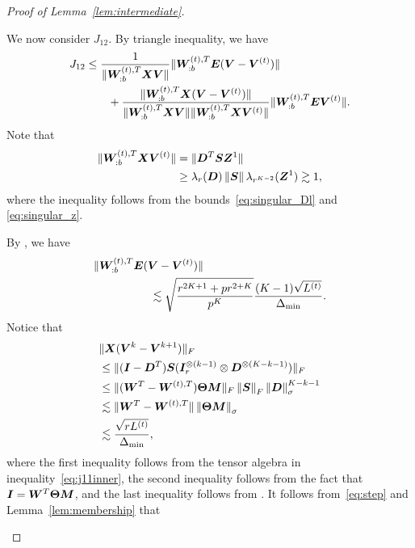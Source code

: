 \documentclass[journal]{IEEEtran}
\theoremstyle{definition}
\theoremstyle{definition}
\begin{document}
\begin{proof}[Proof of Lemma~\ref{lem:intermediate}]
\begin{enumerate}[wide]
    
    We now consider $J_{12}$. By triangle inequality, we have 
    \begin{align}
        J_{12} &\leq \frac{ 1}{\lVert\bm{W}_{:b}^{(t),T} \bm X \bm{V} \rVert} \lVert\bm{W}_{:b}^{(t),T} \bm{E} (\bm{V}-\bm{V}^{(t)})\rVert  \\
        & \quad \quad +
        \frac{ \lVert\bm{W}_{:b}^{(t),T} \bm X (\bm{V}-\bm{V}^{(t)})\rVert }{\lVert\bm{W}_{:b}^{(t),T} \bm X \bm{V} \rVert\lVert\bm{W}_{:b}^{(t),T} \bm X \bm{V}^{(t)} \rVert} \lVert\bm{W}_{:b}^{(t),T} \bm{E} \bm{V}^{(t)} \rVert.
    \end{align}
     Note that 
     \begin{align}
          \onormSize{}{\mW_{:b}^{(t),T} \mX \mV^{(t)}} &= \onormSize{}{\mD^T \mS \mZ^1} 
          \\ &\geq \lambda_r(\mD) \onorm{\mS} \lambda_{r^{K-2}}(\mZ^1) \gtrsim 1, \label{eq:j11_wxvt}
     \end{align}
    where the inequality follows from the bounds~\eqref{eq:singular_Dl} and \eqref{eq:singular_z}.
    
    By \cite[Proof of Lemma 5]{han2020exact}, we have 
    \begin{align}
       & \onormSize{}{\mW_{:b}^{(t),T} \mE (\mV-\mV^{(t)})} \\
        & \quad \quad \quad \quad \quad \lesssim \sqrt{ \frac{r^{2K+1} + p r^{2 + K}}{p^K} } \frac{(K-1)\sqrt{L^{(t)}}}{\Delta_{\min}}. \label{eq:j12_wev}
    \end{align}
    Notice that 
    \begin{align}
        & \onormSize{}{\mX (\mV^k-\mV^{k+1})}_F \\ &\leq \onormSize{}{(\mI - \mD^T) \mS (\mI_r^{\otimes (k-1)} \otimes  \mD^{\otimes (K-k-1)})}_F\notag \\
        &\leq \onormSize{}{(\mW^T - \mW^{(t),T}) \mTheta \mM}_F \onorm{\mS}_F \onorm{ \mD}_{\sigma}^{K-k-1}\notag \\
        & \lesssim \onormSize{}{ \mW^T - \mW^{(t),T} } \onorm{\mTheta \mM}_{\sigma} \notag\\
        & \lesssim \frac{ \sqrt{r L^{(t)}}}{\Delta_{\min}}, \label{eq:step}
    \end{align}
    where the first inequality follows from the tensor algebra in 
    inequality~\eqref{eq:j11inner}, the second inequality follows from the fact  that $\bm I = \bm{W}^T \boldsymbol{\Theta} \bm M$, and the last inequality follows from \cite[Proof of Lemma 5]{han2020exact}. It follows from~\eqref{eq:step} and Lemma~\ref{lem:membership} that
    

\end{enumerate}
\end{proof}
\end{document}
